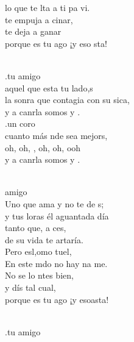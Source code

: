 \documentclass[12pt]{article}
\begin{document}
\begin{multicols*}{2}
\begin{cancion}[Es tu amigo es][Kairoi]
	lo que te lta a ti pa vi. \\
	te empuja a cinar, \\
	te deja a ganar\\
	porque es tu ago ¡y eso sta!\\\jump\\
	\begin{chorus}%
	.tu amigo  \\
	aquel que esta tu lado,s \\
	la sonra que contagia con su sica,\\
	y a canrla somos  y .\\
	.un coro  \\
	cuanto más nde sea mejors, \\
	oh, oh, , oh, oh,  ooh \\
	y a canrla somos  y .  \\
	\end{chorus}%
	\jump\\
	  amigo  \\
	Uno que  ama y no te de s;\\
	y tus loras él aguantada día \\
	tanto que, a ces,\\
	de su vida te artaría. \\
	Pero esl,omo tuel, \\
	En este mdo no hay na me.\\
	No se lo ntes bien,\\
	y dís tal cual,\\
	porque es tu ago ¡y esoasta!\\\jump\\
	\begin{chorus}%
	.tu amigo  \\

\end{chorus}
\end{cancion}
\end{multicols*}
\end{document}
